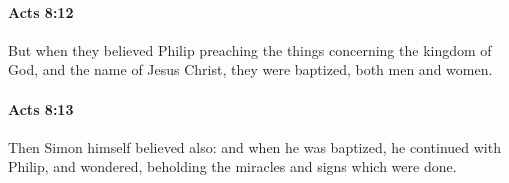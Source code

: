 		\paragraph{Acts 8:12} %
			\label{ACTS-8-12}

			But when they believed Philip preaching the things concerning the kingdom of God, and the name of Jesus Christ, they were baptized, both men and women.

			\begin{framed}
			\scriptsize
				\begin{compactdesc}
					\item[SBLG] 
				\end{compactdesc}
			\end{framed}

		\paragraph{Acts 8:13} %
			\label{ACTS-8-13}

			Then Simon himself believed also: and when he was baptized, he continued with Philip, and wondered, beholding the miracles and signs which were done.

